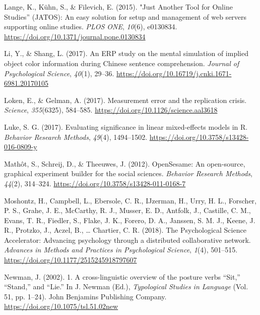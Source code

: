 \documentclass[
  man]{apa7}
\newlength{\cslhangindent}
\newlength{\cslentryspacingunit} %
\newenvironment{CSLReferences}[2] %
 {%
  \setlength{\parindent}{0pt}
  \ifodd #1
  \let\oldpar\par
  \def\par{\hangindent=\cslhangindent\oldpar}
  \fi
  \setlength{\parskip}{#2\cslentryspacingunit}
 }%
 {}
\begin{document}
\begin{CSLReferences}{1}{0}
\leavevmode{}%
Lange, K., Kühn, S., \& Filevich, E. (2015). "{Just Another Tool} for {Online Studies}'' ({JATOS}): {An} easy solution for setup and management of web servers supporting online studies. \emph{PLOS ONE}, \emph{10}(6), e0130834. \url{https://doi.org/10.1371/journal.pone.0130834}

\leavevmode{}%
Li, Y., \& Shang, L. (2017). An ERP study on the mental simulation of implied object color information during Chinese sentence comprehension. \emph{Journal of Psychological Science}, \emph{40}(1), 29--36. \url{https://doi.org/10.16719/j.cnki.1671-6981.20170105}

\leavevmode{}%
Loken, E., \& Gelman, A. (2017). Measurement error and the replication crisis. \emph{Science}, \emph{355}(6325), 584--585. \url{https://doi.org/10.1126/science.aal3618}

\leavevmode{}%
Luke, S. G. (2017). Evaluating significance in linear mixed-effects models in {R}. \emph{Behavior Research Methods}, \emph{49}(4), 1494--1502. \url{https://doi.org/10.3758/s13428-016-0809-y}

\leavevmode{}%
Mathôt, S., Schreij, D., \& Theeuwes, J. (2012). {OpenSesame}: {An} open-source, graphical experiment builder for the social sciences. \emph{Behavior Research Methods}, \emph{44}(2), 314--324. \url{https://doi.org/10.3758/s13428-011-0168-7}

\leavevmode{}%
Moshontz, H., Campbell, L., Ebersole, C. R., IJzerman, H., Urry, H. L., Forscher, P. S., Grahe, J. E., McCarthy, R. J., Musser, E. D., Antfolk, J., Castille, C. M., Evans, T. R., Fiedler, S., Flake, J. K., Forero, D. A., Janssen, S. M. J., Keene, J. R., Protzko, J., Aczel, B., \ldots{} Chartier, C. R. (2018). The {Psychological Science Accelerator}: {Advancing} psychology through a distributed collaborative network. \emph{Advances in Methods and Practices in Psychological Science}, \emph{1}(4), 501--515. \url{https://doi.org/10.1177/2515245918797607}

\leavevmode{}%
Newman, J. (2002). 1. {A} cross-linguistic overview of the posture verbs {``{Sit},''} {``{Stand},''} and {``{Lie}.''} In J. Newman (Ed.), \emph{Typological {Studies} in {Language}} (Vol. 51, pp. 1--24). {John Benjamins Publishing Company}. \url{https://doi.org/10.1075/tsl.51.02new}


\end{CSLReferences}
\end{document}
